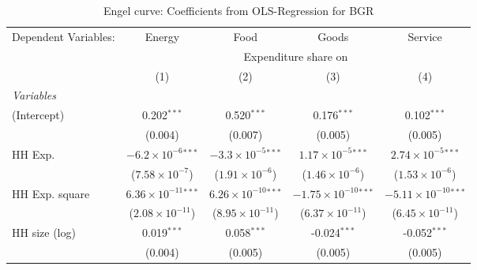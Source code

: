 
\begin{table}[htbp!]
   \centering
   \small
   \begin{adjustbox}{width = 1\textwidth, max height = 0.95\textheight, center}
      \begin{threeparttable}[b]
         \caption{\label{tab:Engel_parametric_BGR} Engel curve: Coefficients from OLS-Regression for BGR}
         \begin{tabular}{lcccc}
            \tabularnewline \midrule \midrule
            Dependent Variables: & Energy                         & Food                           & Goods                           & Service\\  
             & \multicolumn{4}{c}{Expenditure share on} \\ 
                                 & (1)                            & (2)                            & (3)                             & (4)\\  
            \midrule
            \emph{Variables}\\
            (Intercept)          & 0.202$^{***}$                  & 0.520$^{***}$                  & 0.176$^{***}$                   & 0.102$^{***}$\\   
                                 & (0.004)                        & (0.007)                        & (0.005)                         & (0.005)\\   
            HH Exp.              & $-6.2\times 10^{-6}$$^{***}$   & $-3.3\times 10^{-5}$$^{***}$   & $1.17\times 10^{-5}$$^{***}$    & $2.74\times 10^{-5}$$^{***}$\\    
                                 & ($7.58\times 10^{-7}$)         & ($1.91\times 10^{-6}$)         & ($1.46\times 10^{-6}$)          & ($1.53\times 10^{-6}$)\\    
            HH Exp. square       & $6.36\times 10^{-11}$$^{***}$  & $6.26\times 10^{-10}$$^{***}$  & $-1.75\times 10^{-10}$$^{***}$  & $-5.11\times 10^{-10}$$^{***}$\\    
                                 & ($2.08\times 10^{-11}$)        & ($8.95\times 10^{-11}$)        & ($6.37\times 10^{-11}$)         & ($6.45\times 10^{-11}$)\\    
            HH size (log)        & 0.019$^{***}$                  & 0.058$^{***}$                  & -0.024$^{***}$                  & -0.052$^{***}$\\   
                                 & (0.004)                        & (0.005)                        & (0.005)                         & (0.005)\\   

\end{tabular}
\end{threeparttable}
\end{adjustbox}
\end{table}
